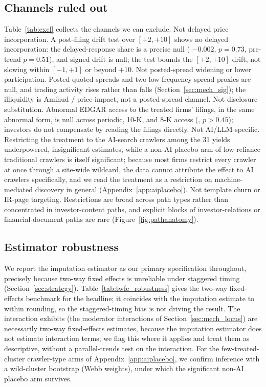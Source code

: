 \documentclass[12pt]{article}
\begin{document}


\subsection{Channels ruled out}\label{app:excl}
Table~\ref{tab:excl} collects the channels we can exclude. Not delayed price incorporation. A post-filing drift test over $[+2,+10]$ shows no delayed incorporation: the delayed-response share is a precise null (\citet{BorusyakJaravelSpiess2024} $-0.002$, $p=0.73$, pre-trend $p=0.51$), and signed drift is null; the test bounds the $[+2,+10]$ drift, not slowing within $[-1,+1]$ or beyond $+10$. Not posted-spread widening or lower participation. Posted quoted spreads and two low-frequency spread proxies \citep{CorwinSchultz2012,AbdiRanaldo2017} are null, and trading activity rises rather than falls (Section~\ref{sec:mech_sig}); the illiquidity is Amihud / price-impact, not a posted-spread channel. Not disclosure substitution. Abnormal EDGAR access to the treated firms' filings, in the same abnormal form, is null across periodic, 10-K, and 8-K access (\citet{BorusyakJaravelSpiess2024}, $p>0.45$); investors do not compensate by reading the filings directly. Not AI/LLM-specific. Restricting the treatment to the AI-search crawlers among the 31 yields underpowered, insignificant estimates, while a non-AI placebo arm of low-reliance traditional crawlers is itself significant; because most firms restrict every crawler at once through a site-wide wildcard, the data cannot attribute the effect to AI crawlers specifically, and we read the treatment as a restriction on machine-mediated discovery in general (Appendix~\ref{app:aiplacebo}). Not template churn or IR-page targeting. Restrictions are broad across path types rather than concentrated in investor-content paths, and explicit blocks of investor-relations or financial-document paths are rare (Figure~\ref{fig:pathanatomy}).



\subsection{Estimator robustness}\label{app:did}
We report the \citet{BorusyakJaravelSpiess2024} imputation estimator as our primary specification throughout, precisely because two-way fixed effects is unreliable under staggered timing \citep{GoodmanBacon2021,deChaisemartinDHaultfoeuille2020} (Section~\ref{sec:strategy}). Table~\ref{tab:twfe_robustness} gives the two-way fixed-effects benchmark for the headline; it coincides with the imputation estimate to within rounding, so the staggered-timing bias is not driving the result. The interaction exhibits (the moderator interactions of Section~\ref{sec:mech_locus}) are necessarily two-way fixed-effects estimates, because the imputation estimator does not estimate interaction terms; we flag this where it applies and treat them as descriptive, without a parallel-trends test on the interaction. For the few-treated-cluster crawler-type arms of Appendix~\ref{app:aiplacebo}, we confirm inference with a wild-cluster bootstrap (Webb weights), under which the significant non-AI placebo arm survives.
\end{document}
